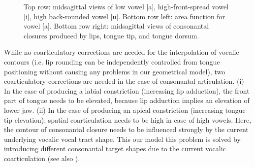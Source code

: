 \documentclass[conference]{IEEEtran}
\begin{document}
\begin{figure}[!t]
\hfil
{}
\hfil
{}
\hfil
{}
\caption{Top row: midsagittal views of low vowel [a],
  high-front-spread vowel [i], high back-rounded vowel [u]. Bottom row
  left: area function for vowel [a]. Bottom row right: midsagittal
  views of consonantal closures produced by lips, tongue tip, and
  tongue dorsum.}
\label{fig:sagi}
\end{figure}

While no coarticulatory corrections are needed for the interpolation
of vocalic contours (i.e. lip rounding can be independently controlled
from tongue positioning without causing any problems in our
geometrical model), two coarticulatory corrections are needed in the
case of consonantal articulation. (i) In the case of producing a
labial constriction (increasing lip adduction), the front part of
tongue needs to be elevated, because lip adduction implies an
elevation of lower jaw. (ii) In the case of producing an apical
constriction (increasing tongue tip elevation), spatial coarticulation
needs to be high in case of high vowels. Here, the contour of
consonantal closure needs to be influenced strongly by the current
underlying vocalic vocal tract shape. This our model this problem is
solved by introducing different consonantal target shapes due to the
current vocalic coarticulation (see also \cite{kroger2004}).
\end{document}
